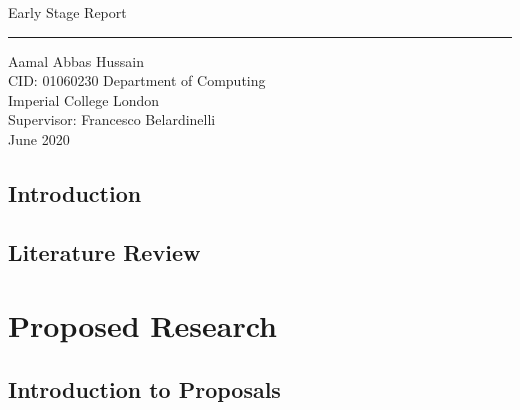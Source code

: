 \documentclass[11pt]{report}
\begin{document}
\clearpage\thispagestyle{empty}
\begin{titlepage}

	\flushright
    \hfill
    \vfill
	{\Huge Early Stage Report \par} 
	\rule[5pt]{\textwidth}{.4pt} \par
	{\Large Aamal Abbas Hussain \\ CID: 01060230}
	\vfill 
    {\Large Department of Computing\\Imperial College London\\Supervisor: Francesco Belardinelli\\
	June 2020 \\}
\end{titlepage}



\tableofcontents

\chapter{Introduction}  \label{ch::Intro}

\chapter{Literature Review}  \label{ch::Lit_Review}

\part*{Proposed Research}

\chapter{Introduction to Proposals}  
\label{ch::IntrotoProposals}
\end{document}
